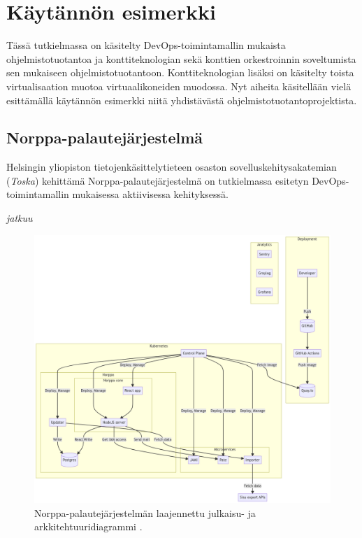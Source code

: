 \chapter{Käytännön esimerkki\label{example}}

Tässä tutkielmassa on käsitelty DevOps-toimintamallin mukaista ohjelmistotuotantoa ja konttiteknologian sekä konttien orkestroinnin soveltumista sen mukaiseen ohjelmistotuotantoon.
Konttiteknologian lisäksi on käsitelty toista virtualisaation muotoa virtuaalikoneiden muodossa.
Nyt aiheita käsitellään vielä esittämällä käytännön esimerkki niitä yhdistävästä ohjelmistotuotantoprojektista.

\section{Norppa-palautejärjestelmä\label{norppa}}

Helsingin yliopiston tietojenkäsittelytieteen osaston sovelluskehitysakatemian (\textit{Toska}) kehittämä Norppa-palautejärjestelmä \cite{Tenhunen23} on tutkielmassa esitetyn DevOps-toimintamallin mukaisessa aktiivisessa kehityksessä.

\textit{jatkuu}

\begin{figure}[ht]
\begin{center}
\includegraphics[width=1\textwidth]{figures/norppa_diagram.png}
\caption{Norppa-palautejärjestelmän laajennettu julkaisu- ja arkkitehtuuridiagrammi \cite{Norppa23}\label{fig:norppa}.}
\end{center}
\end{figure}
